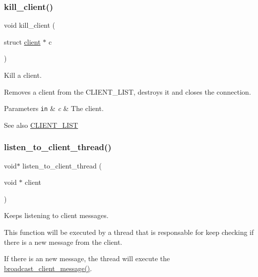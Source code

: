 \subsubsection{\texorpdfstring{kill\+\_\+client()}{kill\_client()}}
{\footnotesize\ttfamily void kill\+\_\+client (\begin{DoxyParamCaption}\item[{struct \hyperlink{structclient}{client} $\ast$}]{c }\end{DoxyParamCaption})}



Kill a client. 

Removes a client from the {\ttfamily C\+L\+I\+E\+N\+T\+\_\+\+L\+I\+ST}, destroys it and closes the connection.


\begin{DoxyParams}[1]{Parameters}
\mbox{\tt in}  & {\em c} & The client.\\
\hline
\end{DoxyParams}
\begin{DoxySeeAlso}{See also}
\hyperlink{zip-zop-server_8c_a32076dcdfaf1057a014d74d01cc7e08e}{C\+L\+I\+E\+N\+T\+\_\+\+L\+I\+ST} 
\end{DoxySeeAlso}
\mbox{\label{zip-zop-server_8c_abb42bd69f5e5088fef8519780a977f98}} 
\subsubsection{\texorpdfstring{listen\+\_\+to\+\_\+client\+\_\+thread()}{listen\_to\_client\_thread()}}
{\footnotesize\ttfamily void$\ast$ listen\+\_\+to\+\_\+client\+\_\+thread (\begin{DoxyParamCaption}\item[{void $\ast$}]{client }\end{DoxyParamCaption})}



Keeps listening to client messages. 

This function will be executed by a thread that is responsable for keep checking if there is a new message from the client.

If there is an new message, the thread will execute the \hyperlink{zip-zop-server_8c_a36e911ded647a0697ca152cae890bcf5}{broadcast\+\_\+client\+\_\+message()}.


